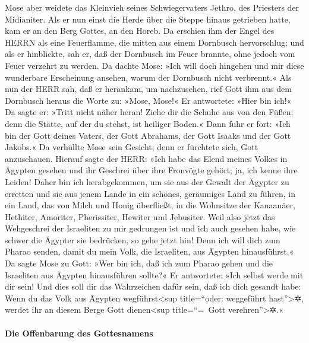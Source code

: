  Mose aber weidete das Kleinvieh seines Schwiegervaters
Jethro, des Priesters der Midianiter. Als er nun einst die Herde über
die Steppe hinaus getrieben hatte, kam er an den Berg Gottes, an den
Horeb.  Da erschien ihm der Engel des HERRN als eine
Feuerflamme, die mitten aus einem Dornbusch hervorschlug; und als er
hinblickte, sah er, daß der Dornbusch im Feuer brannte, ohne jedoch vom
Feuer verzehrt zu werden.  Da dachte Mose: »Ich will doch
hingehen und mir diese wunderbare Erscheinung ansehen, warum der
Dornbusch nicht verbrennt.«  Als nun der HERR sah, daß er
herankam, um nachzusehen, rief Gott ihm aus dem Dornbusch heraus die
Worte zu: »Mose, Mose!« Er antwortete: »Hier bin ich!«  Da
sagte er: »Tritt nicht näher heran! Ziehe dir die Schuhe aus von den
Füßen; denn die Stätte, auf der du stehst, ist heiliger Boden.«
 Dann fuhr er fort: »Ich bin der Gott deines Vaters, der
Gott Abrahams, der Gott Isaaks und der Gott Jakobs.« Da verhüllte Mose
sein Gesicht; denn er fürchtete sich, Gott anzuschauen. 
Hierauf sagte der HERR: »Ich habe das Elend meines Volkes in Ägypten
gesehen und ihr Geschrei über ihre Fronvögte gehört; ja, ich kenne ihre
Leiden!  Daher bin ich herabgekommen, um sie aus der
Gewalt der Ägypter zu erretten und sie aus jenem Lande in ein schönes,
geräumiges Land zu führen, in ein Land, das von Milch und Honig
überfließt, in die Wohnsitze der Kanaanäer, Hethiter, Amoriter,
Pherissiter, Hewiter und Jebusiter.  Weil also jetzt das
Wehgeschrei der Israeliten zu mir gedrungen ist und ich auch gesehen
habe, wie schwer die Ägypter sie bedrücken,  so gehe
jetzt hin! Denn ich will dich zum Pharao senden, damit du mein Volk, die
Israeliten, aus Ägypten hinausführst.«  Da sagte Mose zu
Gott: »Wer bin ich, daß ich zum Pharao gehen und die Israeliten aus
Ägypten hinausführen sollte?«  Er antwortete: »Ich selbst
werde mit dir sein! Und dies soll dir das Wahrzeichen dafür sein, daß
ich dich gesandt habe: Wenn du das Volk aus Ägypten
wegführst\textless sup title=``oder: weggeführt hast''\textgreater✲,
werdet ihr an diesem Berge Gott dienen\textless sup title=``=~Gott
verehren''\textgreater✲.«

\hypertarget{die-offenbarung-des-gottesnamens}{%
\paragraph{Die Offenbarung des
Gottesnamens}\label{die-offenbarung-des-gottesnamens}}

